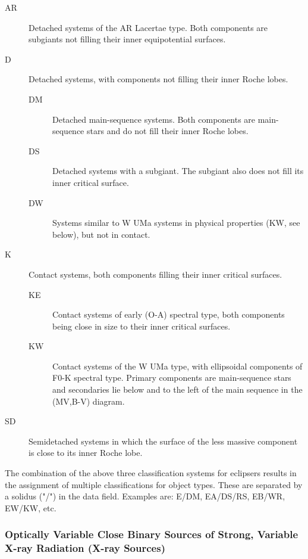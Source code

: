\begin{description}
\item[AR]     Detached systems of the AR Lacertae type. Both components
              are subgiants not filling their inner equipotential surfaces.
\item[D]      Detached systems, with components not filling their inner Roche lobes.
	\begin{description}
\item[DM]     Detached main-sequence systems. Both components are
              main-sequence stars and do not fill their inner Roche lobes.
\item[DS]     Detached systems with a subgiant. The subgiant also does
              not fill its inner critical surface.
\item[DW]     Systems similar to W UMa systems in physical properties (KW, see below), but not in contact.
	\end{description}
\item[K]      Contact systems, both components filling their inner critical surfaces.
	\begin{description}
\item[KE]     Contact systems of early (O-A) spectral type, both
              components being close in size to their inner critical surfaces.
\item[KW]     Contact systems of the W UMa type, with ellipsoidal
              components of F0-K spectral type. Primary components are main-sequence
              stars and secondaries lie below and to the left of the main sequence in the (MV,B-V) diagram.
	\end{description}
\item[SD]     Semidetached systems in which the surface of the less
              massive component is close to its inner Roche lobe.
\end{description}

The combination of the above three classification systems for eclipsers
results in the assignment of multiple classifications for object types.
These are separated by a solidus ("/") in the data field. Examples are:
E/DM, EA/DS/RS, EB/WR, EW/KW, etc.

\subsubsection{Optically Variable Close Binary Sources of Strong, Variable X-ray Radiation (X-ray Sources)}
\label{optically-variable-close-binary-sources-of-strong-variable-x-ray-radiation-x-ray-sources}


